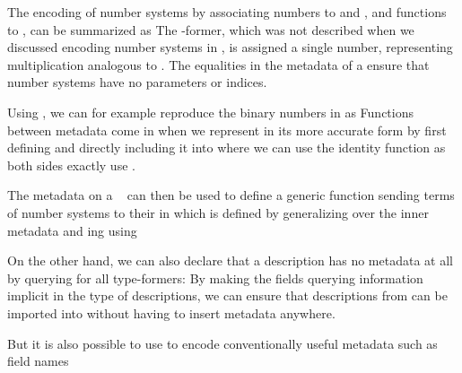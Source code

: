The encoding of number systems by associating numbers to  and , and functions to , can be summarized as
The -former, which was not described when we discussed encoding number systems in , is assigned a single number, representing multiplication analogous to . The equalities in the metadata of a  ensure that number systems have no parameters or indices. 

Using , we can for example reproduce the binary numbers  in  as
Functions between metadata come in when we represent  in its more accurate form by first defining 
and directly including it into 
where we can use the identity function as both sides exactly use .

The metadata on a \  can then be used to define a generic function sending terms of number systems to their  in \bN{}
which is defined by generalizing over the inner metadata and ing using

On the other hand, we can also declare that a description has no metadata at all by querying  for all type-formers:
By making the fields querying information implicit in the type of descriptions, we can ensure that descriptions from  can be imported into  without having to insert metadata anywhere.

But it is also possible to use  to encode conventionally useful metadata such as field names

